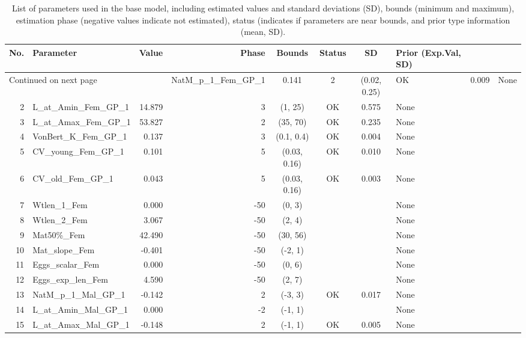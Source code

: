 \documentclass[12pt,]{article}
\begin{document}
\begin{landscape}
\begin{longtable}{rlrrcccl}
\caption{List of parameters used in
                                              the base model, including estimated 
                                              values and standard deviations (SD), 
                                              bounds (minimum and maximum), 
                                              estimation phase (negative values indicate
                                              not estimated), status (indicates if 
                                              parameters are near bounds, and prior type
                                              information (mean, SD).} \\ 
  \hline
No. & Parameter & Value & Phase & Bounds & Status & SD & Prior (Exp.Val, SD)  \\ 
  \hline 
\endhead 
\hline 
\multicolumn{3}{l}{\footnotesize Continued on next page} 
\endfoot 
\endlastfoot 
 \hline
1 & NatM\_p\_1\_Fem\_GP\_1 & 0.141 & 2 & (0.02, 0.25) & OK & 0.009 & None \\ 
  2 & L\_at\_Amin\_Fem\_GP\_1 & 14.879 & 3 & (1, 25) & OK & 0.575 & None \\ 
  3 & L\_at\_Amax\_Fem\_GP\_1 & 53.827 & 2 & (35, 70) & OK & 0.235 & None \\ 
  4 & VonBert\_K\_Fem\_GP\_1 & 0.137 & 3 & (0.1, 0.4) & OK & 0.004 & None \\ 
  5 & CV\_young\_Fem\_GP\_1 & 0.101 & 5 & (0.03, 0.16) & OK & 0.010 & None \\ 
  6 & CV\_old\_Fem\_GP\_1 & 0.043 & 5 & (0.03, 0.16) & OK & 0.003 & None \\ 
  7 & Wtlen\_1\_Fem & 0.000 & -50 & (0, 3) &  &  & None \\ 
  8 & Wtlen\_2\_Fem & 3.067 & -50 & (2, 4) &  &  & None \\ 
  9 & Mat50\%\_Fem & 42.490 & -50 & (30, 56) &  &  & None \\ 
  10 & Mat\_slope\_Fem & -0.401 & -50 & (-2, 1) &  &  & None \\ 
  11 & Eggs\_scalar\_Fem & 0.000 & -50 & (0, 6) &  &  & None \\ 
  12 & Eggs\_exp\_len\_Fem & 4.590 & -50 & (2, 7) &  &  & None \\ 
  13 & NatM\_p\_1\_Mal\_GP\_1 & -0.142 & 2 & (-3, 3) & OK & 0.017 & None \\ 
  14 & L\_at\_Amin\_Mal\_GP\_1 & 0.000 & -2 & (-1, 1) &  &  & None \\ 
  15 & L\_at\_Amax\_Mal\_GP\_1 & -0.148 & 2 & (-1, 1) & OK & 0.005 & None \\ 

\end{longtable}
\end{landscape}
\end{document}
